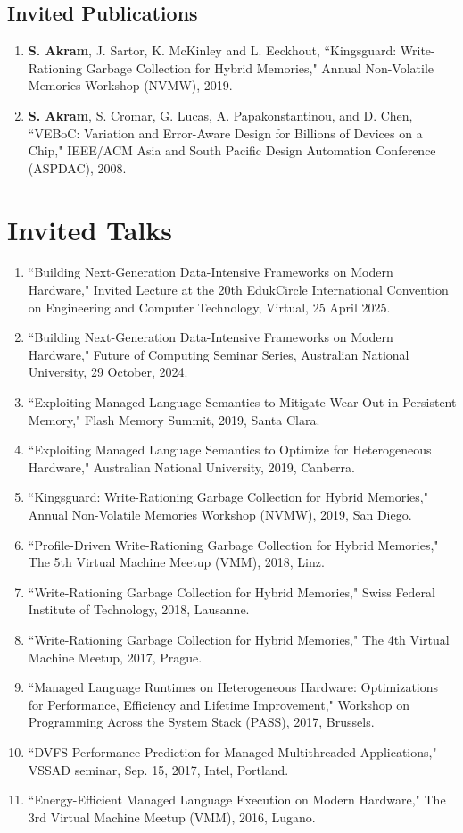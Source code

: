 \documentclass[singlecolumn,singlespace,11pt,a4paper]{article}
\begin{document}
\subsection*{Invited Publications}
\begin{enumerate}
\item
\textbf{S. Akram}, J. Sartor, K. McKinley and L. Eeckhout, ``Kingsguard: Write-Rationing Garbage Collection for Hybrid Memories," Annual Non-Volatile Memories Workshop (NVMW), 2019. 

\item
\textbf{S. Akram}, S. Cromar, G. Lucas, A. Papakonstantinou, and D. Chen, ``VEBoC: Variation and Error-Aware Design for Billions of Devices on a Chip," 
IEEE/ACM Asia and South Pacific Design Automation Conference (ASPDAC), 2008.
\end{enumerate}


\section*{Invited Talks}
\begin{enumerate}
\item ``Building Next-Generation Data-Intensive Frameworks on Modern Hardware," Invited Lecture at the 20th EdukCircle International Convention on Engineering and Computer Technology, Virtual, 25 April 2025.
\item ``Building Next-Generation Data-Intensive Frameworks on Modern Hardware," Future of Computing Seminar Series, Australian National University, 29 October, 2024.
\item ``Exploiting Managed Language Semantics to Mitigate Wear-Out in Persistent Memory," Flash Memory Summit, 2019, Santa Clara.
\item ``Exploiting Managed Language Semantics to Optimize for Heterogeneous Hardware," Australian National University, 2019, Canberra.
\item ``Kingsguard: Write-Rationing Garbage Collection for Hybrid Memories," Annual Non-Volatile Memories Workshop (NVMW), 2019, San Diego.
\item ``Profile-Driven Write-Rationing Garbage Collection for Hybrid Memories," The 5th Virtual Machine Meetup (VMM), 2018, Linz.
\item ``Write-Rationing Garbage Collection for Hybrid Memories," Swiss Federal Institute of Technology, 2018, Lausanne.
\item ``Write-Rationing Garbage Collection for Hybrid Memories," The 4th Virtual Machine Meetup, 2017, Prague.
\item ``Managed Language Runtimes on Heterogeneous Hardware: Optimizations for Performance, Efficiency and Lifetime Improvement," Workshop on Programming Across the System Stack (PASS), 2017, Brussels.
\item ``DVFS Performance Prediction for Managed Multithreaded Applications," VSSAD seminar, Sep. 15, 2017, Intel, Portland.
\item ``Energy-Efficient Managed Language Execution on Modern Hardware," The 3rd Virtual Machine Meetup (VMM), 2016, Lugano.
\end{enumerate}
\end{document}
